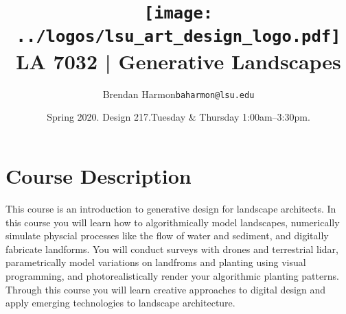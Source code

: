\documentclass[11pt,article,oneside]{memoir}
\makeatletter
\def\myauthor{Author}
\def\mytitle{Title}
\def\myemail{baharmon@lsu.edu}
\def\myauthor{Brendan Harmon}
\def\mytitle{ \texttt{[image: ../logos/lsu\_art\_design\_logo.pdf]} \\[0.1cm] {\normalfont \normalsize LA 7032 |} \Large Generative Landscapes}
\newcommand{\globalcolor}[1]{%
  \color{#1}\global\let\default@color\current@color
}
\makeatother
\begin{document}
\setlength\bibitemsep{0.5em}

\setmainfont[Scale=1, Path = ../fonts/lato/,BoldItalicFont=Lato-RegIta,BoldFont=Lato-Reg,ItalicFont=Lato-LigIta]{Lato-Lig}
\setsansfont[Scale=1, Path = ../fonts/lato/,BoldItalicFont=Lato-RegIta,BoldFont=Lato-Reg,ItalicFont=Lato-LigIta]{Lato-Lig}
\setmonofont[Mapping=tex-text,Scale=0.8,Path = ../fonts/inconsolata/]{i}

\def\ind{\hangindent=1 true cm\hangafter=1 \noindent}
\def\labelitemi{$\cdot$}

\title{\LARGE \mytitle}
\author{\Large\myauthor \newline \footnotesize\texttt{\noindent\myemail}}
\date{Spring 2020. Design 217.\newline Tuesday \& Thursday 1:00am--3:30pm.}
\published{\,}


\globalcolor{black}
\vspace*{-10em}
\maketitle
{}
\clearpage



\globalcolor{black}

\vspace*{-10em}
\maketitle

\section{Course Description}

This course is an introduction to 
generative design for landscape architects.
%
In this course you will learn how to 
algorithmically model landscapes,
numerically simulate physcial processes 
like the flow of water and sediment,
and digitally fabricate landforms.  
%
You will conduct surveys with drones and terrestrial lidar,
parametrically model variations on landfroms and planting
using visual programming, 
and photorealistically render 
your algorithmic planting patterns.
%
Through this course you will 
learn creative approaches to digital design 
and apply emerging technologies to landscape architecture.
\\
\end{document}
